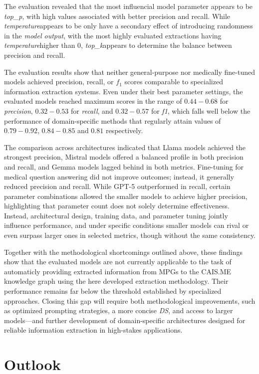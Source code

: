 \documentclass[bs, english]{stthesis}
\newcommand{\temperature}{{\textit{temperature}}}
\newcommand{\topP}{{\textit{top\_p}}}
\newcommand{\topK}{{\textit{top\_k}}}
\begin{document}
The evaluation revealed that the most influencial model parameter appears to be \topP, with high values associated with better precision and recall. While \temperature appears to be only have a secondary effect of introducing randomness in the \textit{model output}, with the most highly evaluated extractions having \temperature higher than $0$, \topK appears to determine the balance between precision and recall.

The evaluation results show that neither general-purpose nor medically fine-tuned models achieved precision, recall, or $f_1$ scores comparable to specialized information extraction systems. Even under their best parameter settings, the evaluated models reached maximum scores in the range of $0.44-0.68$ for \textit{precision}, $0.32-0.53$ for \textit{recall}, and $0.32-0.57$ for \textit{f1}, which falls well below the performance of domain-specific methods that regularly attain values of $0.79-0.92$, $0.84-0.85$ and $0.81$ respectively.

The comparison across architectures indicated that Llama models achieved the strongest precision, Mistral models offered a balanced profile in both precision and recall, and Gemma models lagged behind in both metrics. Fine-tuning for medical question answering did not improve outcomes; instead, it generally reduced precision and recall. While GPT-5 outperformed in recall, certain parameter combinations allowed the smaller models to achieve higher precision, highlighting that parameter count does not solely determine effectiveness. Instead, architectural design, training data, and parameter tuning jointly influence performance, and under specific conditions smaller models can rival or even surpass larger ones in selected metrics, though without the same consistency.

Together with the methodological shortcomings outlined above, these findings show that the evaluated models are not currently applicable to the task of automaticly providing extracted information from MPGs to the CAIS.ME knowledge graph using the here developed extraction methodology. Their performance remains far below the threshold established by specialized approaches. Closing this gap will require both methodological improvements, such as optimized prompting strategies, a more concise \textit{DS}, and access to larger models—and further development of domain-specific architectures designed for reliable information extraction in high-stakes applications.

\section{Outlook}
\end{document}
